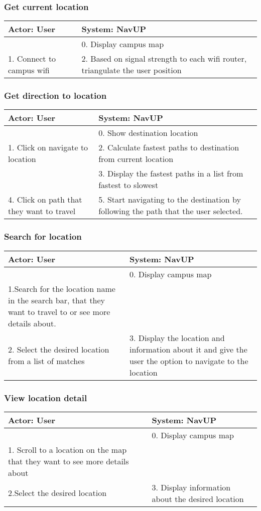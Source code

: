\documentclass[12pt,a4paper]{article}
\begin{document}
		\subsubsection{Get current location}
		\begin{tabular}{|p{7cm}|p{7cm}|}
			\hline
			\textbf{Actor: User} & \textbf{System: NavUP}\\
			\hline
			 & 0. Display campus map\\
			\hline
			1. Connect to campus wifi & 2.  Based on signal strength to each wifi router, triangulate the user position \\
			\hline
		\end{tabular}
		\subsubsection{Get direction to location}
		\begin{tabular}{|p{7cm}|p{7cm}|}
			\hline
			\textbf{Actor: User} & \textbf{System: NavUP}\\
			\hline
			 & 0. Show destination location\\
			\hline
			1. Click on navigate to location & 2.   Calculate fastest paths to destination from current location  \\
			\hline
			& 3. Display the fastest paths in a list from fastest to slowest \\
			\hline
			4. Click on path that they want to travel &  5. Start navigating to the destination by following the path that the user selected.\\
			\hline
		\end{tabular}
		\subsubsection{Search for location}
		\begin{tabular}{|p{7cm}|p{7cm}|}
			\hline
			\textbf{Actor: User} & \textbf{System: NavUP}\\
			\hline
			 & 0. Display campus map\\
			\hline
			1.Search for the location name in the search bar, that they want to travel to or see more details about. &  \\
			\hline
			2. Select the desired location from a list of matches & 3. Display the location and information about it and give the user the option to navigate to the location \\
			\hline
		\end{tabular}
		\subsubsection{View location detail}
		\begin{tabular}{|p{7cm}|p{7cm}|}
			\hline
			\textbf{Actor: User} & \textbf{System: NavUP}\\
			\hline
			 & 0. Display campus map\\
			\hline
			1. Scroll to a location on the map that they want to see more details about &  \\
			\hline
			2.Select the desired location & 3. Display information about the desired location\\
			\hline
		\end{tabular}
\end{document}
